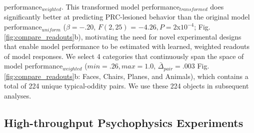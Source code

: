 \documentclass[11pt]{article}
\begin{document}
performance$_{weighted}$. This transformed model performance$_{transformed}$ does significantly better at predicting PRC-lesioned behavior than the original model performance$_{uniform}$ ($\beta = -.20$, $F(2, 25)$ = $-4.26, P = 2$x$10 ^{-4}$; Fig. \ref{fig:compare_readouts}b), motivating the need for novel experimental designs that enable model performance to be estimated with learned, weighted readouts of model responses. We select 4 categories that continuously span the space of model performance$_{weighted}$ ($min=.26, max=1.0$, $\bar\Delta_{pair}=.003$ Fig. \ref{fig:compare_readouts}b: Faces, Chairs, Planes, and Animals), which contains a total of 224 unique typical-oddity pairs. We use these 224 objects in subsequent analyses. 

\subsection{High-throughput Psychophysics Experiments}
\end{document}
